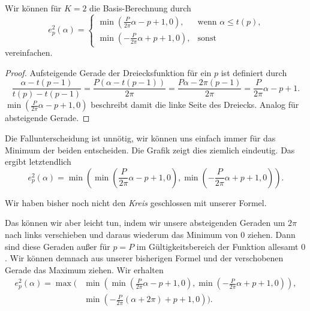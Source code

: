 Wir können für $K=2$ die Basis-Berechnung durch
\begin{equation}
  e_p^2\left(\alpha\right) = \begin{cases}
    \min\left(\frac{P}{2\pi} \alpha - p + 1, 0\right), & \text{wenn }\alpha \leq t\left(p\right)\text{,}\\
    \min\left(-\frac{P}{2\pi} \alpha + p + 1, 0\right), & \text{sonst}
  \end{cases}
\end{equation}
vereinfachen.

\begin{proof}
  Aufsteigende Gerade der Dreiecksfunktion für ein $p$ ist definiert durch
  \begin{equation}
    \frac{\alpha - t\left(p-1\right)}{t\left(p\right) - t\left(p-1\right)} = \frac{P\left(\alpha - t\left(p-1\right)\right)}{2\pi} = \frac{P\alpha - 2\pi\left(p-1\right)}{2\pi} = \frac{P}{2\pi}\alpha - p + 1.
  \end{equation}
  $\min \left(\frac{P}{2\pi} \alpha - p + 1, 0\right)$ beschreibt damit die linke Seite des Dreiecks.
  Analog für absteigende Gerade.
\end{proof}

Die Fallunterscheidung ist unnötig, wir können uns einfach immer für das Minimum der beiden entscheiden.
Die Grafik zeigt dies ziemlich eindeutig.
Das ergibt letztendlich
\begin{equation}
  e_p^2\left(\alpha\right) = \min \left( \min\left(\frac{P}{2\pi} \alpha - p + 1, 0\right), \min\left(-\frac{P}{2\pi} \alpha + p + 1, 0\right) \right)\text{.}
\end{equation}



Wir haben bisher noch nicht den \emph{Kreis} geschlossen mit unserer Formel.

Das können wir aber leicht tun, indem wir unsere absteigenden Geraden um $2\pi$ nach links verschieben und daraus wiederum das Minimum von $0$ ziehen.
Dann sind diese Geraden außer für $p = P$ im Gültigkeitsbereich der Funktion allesamt $0$.
Wir können demnach aus unserer bisherigen Formel und der verschobenen Gerade das Maximum ziehen.
Wir erhalten
\begin{equation}
\begin{split}
  e_p^2\left(\alpha\right) = \max \biggr( & \min \left( \min\left(\frac{P}{2\pi} \alpha - p + 1, 0\right), \min\left(-\frac{P}{2\pi} \alpha + p + 1, 0\right) \right),\\
  & \min \left(-\frac{P}{2\pi} \left( \alpha + 2\pi \right) + p + 1, 0\right) \biggr)\text{.}
\end{split}
\end{equation}

